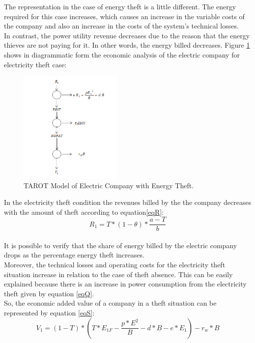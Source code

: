 \documentclass[10pt, letterpaper]{elsarticle}
\begin{document}
The representation in the case of energy theft is a little different. The energy required for this case increases, which causes an increase in the variable costs of the company and also an increase in the costs of the system's technical losses. \\
In contrast, the power utility revenue decreases due to the reason that the energy thieves are not paying for it. In other words, the energy billed decreases. 
Figure \ref{Fig5} shows in diagrammatic form the economic analysis of the electric company for electricity theft case:

\begin{figure}[h]%
\centering
\includegraphics[width = 0.45\textwidth]{Fig5.png} 
\caption{TAROT Model of Electric Company with Energy Theft.}
\label{Fig5}
\end{figure}
In the electricity theft condition the revenues billed by the the company decreases with the amount of theft according to equation\ref{eqR}:\\
\begin{equation}
R_1 = T*(1-\theta)* \frac{a-T}{b}
\label{eqR}
\end{equation}\\
It is possible to verify that the share of energy billed by the electric company drops as the percentage energy theft  increases.\\
Moreover, the technical losses and operating costs for the electricity theft situation increase in relation to the case of theft absence. This can be easily explained because there is an increase in power consumption from the electricity theft given by equation \ref{eqQ}. \\
So, the economic added value of a company in a theft situation can be represented by equation \ref{eqS}:
\begin{equation}
V_1 = (1-T)*\left( T*E_{1F} - \frac{p*E^2}{B} - d*B -e*E_1\right) - r_w * B
\label{eqS}
\end{equation}\\
\end{document}
